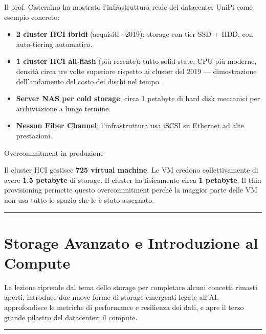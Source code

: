 \documentclass[
  italian,
  openany]{book}
\providecommand{\tightlist}{%
  \setlength{\itemsep}{0pt}\setlength{\parskip}{0pt}}
\begin{document}
Il prof. Cisternino ha mostrato l'infrastruttura reale del datacenter
UniPi come esempio concreto:

\begin{itemize}
\tightlist
\item
  \textbf{2 cluster HCI ibridi} (acquisiti \textasciitilde2019): storage
  con tier SSD + HDD, con auto-tiering automatico.
\item
  \textbf{1 cluster HCI all-flash} (più recente): tutto solid state, CPU
  più moderne, densità circa tre volte superiore rispetto ai cluster del
  2019 --- dimostrazione dell'andamento del costo dei dischi nel tempo.
\item
  \textbf{Server NAS per cold storage}: circa 1 petabyte di hard disk
  meccanici per archiviazione a lungo termine.
\item
  \textbf{Nessun Fiber Channel}: l'infrastruttura usa iSCSI su Ethernet
  ad alte prestazioni.
\end{itemize}

\begin{callouttip}{Overcommitment in produzione}

Il cluster HCI gestisce \textbf{725 virtual machine}. Le VM credono
collettivamente di avere \textbf{1.5 petabyte} di storage. Il cluster ha
fisicamente circa \textbf{1 petabyte}. Il thin provisioning permette
questo overcommitment perché la maggior parte delle VM non usa tutto lo
spazio che le è stato assegnato.

\end{callouttip}

\begin{center}\rule{0.5\linewidth}{0.5pt}\end{center}

\newpage

\chapter{Storage Avanzato e Introduzione al
Compute}\label{storage-avanzato-e-introduzione-al-compute}

La lezione riprende dal tema dello storage per completare alcuni
concetti rimasti aperti, introduce due nuove forme di storage emergenti
legate all'AI, approfondisce le metriche di performance e resilienza dei
dati, e apre il terzo grande pilastro del datacenter: il compute.

\begin{center}\rule{0.5\linewidth}{0.5pt}\end{center}
\end{document}
